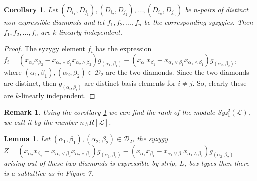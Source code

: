 \documentclass[10pt,reqno]{amsart}
\numberwithin{equation}{section}
\newtheorem{lemma}[theorem]{Lemma}
\newtheorem{remark}[theorem]{Remark}
\newtheorem{corollary}[theorem]{Corollary}
\begin{document}
\begin{corollary}\label{linear_indep_diamond}
Let $(D_{i_1},D_{j_1}), (D_{i_2},D_{j_2}),\ldots, (D_{i_n},D_{j_n})$ be $n$-pairs of distinct non-expressible diamonds and let $f_1, f_2,\ldots,f_n$ be the corresponding syzygies. Then $f_1, f_2,\ldots, f_n$ are $k$-linearly independent.
\end{corollary}
\begin{proof}
The syzygy element $f_i$ has the expression $f_i = (x_{\alpha_2}x_{\beta_2}-x_{\alpha_2 \vee \beta_2}x_{\alpha_2 \wedge \beta_2})g_{(\alpha_1,\beta_1)}-
(x_{\alpha_1}x_{\beta_1}- x_{\alpha_1 \vee \beta_1}x_{\alpha_1 \wedge \beta_1})g_{(\alpha_2,\beta_2)}$, where  $(\alpha_1,\beta_1), (\alpha_2,\beta_2)\in \mathcal{D}_2$ are the two diamonds. Since the two diamonds are distinct, then $g_{(\alpha_i, \beta_i)}$ are distinct basis elements for $i \neq j$. So, clearly these are $k$-linearly independent. 
\end{proof}
\begin{remark}
Using the corollary \ref{linear_indep_diamond} we can find the rank of the module Syz$_1^2(\mathcal{L})$, we call it by the number $n_{\mathcal{D}}R[\mathcal{L}]$.
\end{remark}
\begin{lemma}
\label{lemma_reverse}
  Let $(\alpha_1,\beta_1),(\alpha_2,\beta_2)\in \mathcal{D}_2$, the syzygy $Z=(x_{\alpha_2}x_{\beta_2}-x_{\alpha_2 \vee \beta_2}x_{\alpha_2 \wedge \beta_2})g_{(\alpha_1,\beta_1)}-
(x_{\alpha_1}x_{\beta_1}- x_{\alpha_1 \vee \beta_1}x_{\alpha_1 \wedge \beta_1})g_{(\alpha_2,\beta_2)}$ arising out of these two diamonds is
  expressible by strip, $L$, box types then there is a sublattice as in Figure 7.
 \end{lemma}
\end{document}
